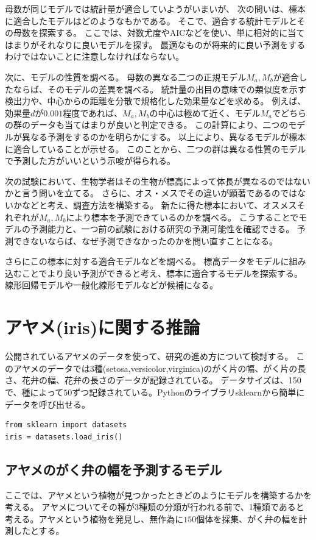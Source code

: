 母数が同じモデルでは統計量が適合していようがいまいが、
次の問いは、標本に適合したモデルはどのようなもかである。
そこで、適合する統計モデルとその母数を探索する。
ここでは、対数尤度やAICなどを使い、単に相対的に当てはまりがそれなりに良いモデルを探す。
最適なものが将来的に良い予測をするわけではないことに注意しなければならない。

次に、モデルの性質を調べる。
母数の異なる二つの正規モデル$M_a,M_b$が適合したならば、そのモデルの差異を調べる。
統計量の出目の意味での類似度を示す検出力や、中心からの距離を分散で規格化した効果量などを求める。
例えば、効果量$d$が$0.001$程度であれば、$M_a,M_b$の中心は極めて近く、モデル$M_a$でどちらの群のデータも当てはまりが良いと判定できる。
この計算により、二つのモデルが異なる予測をするのかを明らかにする。
以上により、異なるモデルが標本に適合していることが示せる。
このことから、二つの群は異なる性質のモデルで予測した方がいいという示唆が得られる。

次の試験において、生物学者はその生物が標高によって体長が異なるのではないかと言う問いを立てる。
さらに、オス・メスでその違いが顕著であるのではないかなどと考え、調査方法を構築する。
新たに得た標本において、オスメスそれぞれが$M_a,M_b$により標本を予測できているのかを調べる。
こうすることでモデルの予測能力と、一つ前の試験における研究の予測可能性を確認できる。
予測できないならば、なぜ予測できなかったのかを問い直すことになる。

さらにこの標本に対する適合モデルなどを調べる。
標高データをモデルに組み込むことでより良い予測ができると考え、標本に適合するモデルを探索する。
線形回帰モデルや一般化線形モデルなどが候補になる。


\section{アヤメ(iris)に関する推論}
公開されているアヤメのデータを使って、研究の進め方について検討する。
このアヤメのデータでは$3$種(setosa,versicolor,virginica)のがく片の幅、がく片の長さ、花弁の幅、花弁の長さのデータが記録されている。
データサイズは、150で、種によって$50$ずつ記録されている。Pythonのライブラリsklearnから簡単にデータを呼び出せる。
\begin{lstlisting}
from sklearn import datasets
iris = datasets.load_iris()
\end{lstlisting}

\subsection{アヤメのがく弁の幅を予測するモデル}
ここでは、アヤメという植物が見つかったときどのようにモデルを構築するかを考える。
アヤメについてその種が3種類の分類が行われる前で、1種類であると考える。アヤメという植物を発見し、無作為に$150$個体を採集、がく弁の幅を計測したとする。

